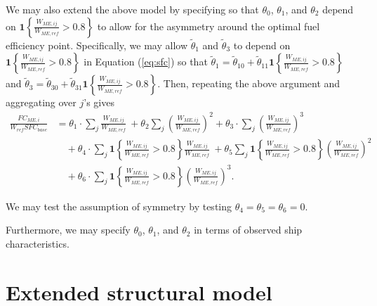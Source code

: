 \documentclass{article}
\begin{document}
We may also extend the above model by specifying so that $\theta_0$, $\theta_1$, and $\theta_2$ depend on $\mathbf{1}\left\{\frac{W_{ME,ij}}{W_{ME,ref}} >0.8\right\}$ to allow for the asymmetry around the optimal fuel efficiency point.
Specifically, we may allow $\tilde\theta_1$ and $\tilde\theta_3$ to depend on $\mathbf{1}\left\{\frac{W_{ME,ij}}{W_{ME,ref}} >0.8\right\}$ in Equation (\ref{eq:sfc}) so that $\tilde\theta_1=\tilde\theta_{10} +\tilde\theta_{11} \mathbf{1}\left\{\frac{W_{ME,ij}}{W_{ME,ref}} >0.8\right\}$ and $\tilde\theta_3=\tilde\theta_{30} +\tilde\theta_{31} \mathbf{1}\left\{\frac{W_{ME,ij}}{W_{ME,ref}} >0.8\right\}$. Then, repeating the above argument and aggregating over $j$'s gives
\begin{align*}
\frac{FC_{ME,i}}{ W_{ref} SFC_{base}}
 &=   \theta_1  \cdot  \sum_{j} \frac{W_{ME,ij}}{W_{ME,ref} } \ + \theta_2  \sum_{j} \left(\frac{W_{ME,ij}}{W_{ME,ref} }\right)^2 +   \theta_3 \cdot \sum_{j}\left( \frac{W_{ME,ij}}{W_{ME,ref}} \right)^3 \\
 &\quad+\theta_4  \cdot  \sum_{j}  \mathbf{1}\left\{\frac{W_{ME,ij}}{W_{ME,ref}} >0.8\right\} \frac{W_{ME,ij}}{W_{ME,ref} } \ + \theta_5  \sum_{j}  \mathbf{1}\left\{\frac{W_{ME,ij}}{W_{ME,ref}} >0.8\right\}\left(\frac{W_{ME,ij}}{W_{ME,ref} }\right)^2 \\
 &\quad +   \theta_6 \cdot \sum_{j} \mathbf{1}\left\{\frac{W_{ME,ij}}{W_{ME,ref}} >0.8\right\}\left( \frac{W_{ME,ij}}{W_{ME,ref}} \right)^3.
\end{align*}

We may test the assumption of symmetry by testing $\theta_4=\theta_5=\theta_6=0$.


Furthermore, we may specify  $\theta_0$, $\theta_1$, and $\theta_2$  in terms of observed ship characteristics.

\section{Extended structural model}
\end{document}
